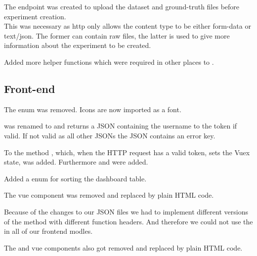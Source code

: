 The endpoint  was created to upload the dataset and ground-truth files before experiment creation.\\
This was necessary as http only allows the content type to be either form-data or text/json. The former can contain raw files, the latter is used to give more information about the experiment to be created.

Added more helper functions which were required in other places to .


\subsection{Front-end}

The  enum was removed. Icons are now imported as a font.

 was renamed to  and returns a JSON containing the username to the token if valid. If not valid as all other JSONs the JSON contains an error key.

To  the method
, which, when the HTTP request has a valid token, sets the Vuex state, was added. Furthermore  and  were added.

Added a  enum for sorting the dashboard table.

The  vue component was removed and replaced by plain HTML code.

Because of the changes to our JSON files we had to implement different versions of the  method with different function headers. And therefore we could not use the  in all of our frontend modles.

The  and  vue components also got removed and replaced by plain HTML code.

\newpage

